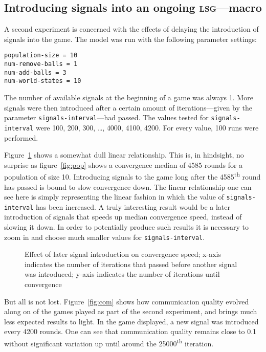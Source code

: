 \documentclass[DIV=calc,BCOR=0mm,pagesize]{scrartcl}
\newcommand{\code}[1]{\texttt{#1}}
\newcommand{\lsg}{\textsc{lsg}}
\begin{document}
\subsection{Introducing signals into an ongoing \lsg---macro}
\label{ssec:resintmacro}
A second experiment is concerned with the effects of delaying the introduction of signals into the game. The model was run with the following parameter settings:
\begin{verbatim}
population-size = 10
num-remove-balls = 1
num-add-balls = 3
num-world-states = 10
\end{verbatim}
The number of available signals at the beginning of a game was always 1.
More signals were then introduced after a certain amount of iterations---given by the parameter \code{signals-interval}---had passed.
The values tested for \code{signals-interval} were 100, 200, 300, \ldots, 4000, 4100, 4200.
For every value, 100 runs were performed.

Figure~\ref{fig:sig} shows a somewhat dull linear relationship.
This is, in hindsight, no surprise as figure~\ref{fig:pop} shows a convergence median of 4585 rounds for a population of size 10.
Introducing signals to the game long after the 4585\textsuperscript{th} round has passed is bound to slow convergence down.
The linear relationship one can see here is simply representing the linear fashion in which the value of \code{signals-interval} has been increased.
A truly interesting result would be a later introduction of signals that speeds up median convergence speed, instead of slowing it down.
In order to potentially produce such results it is necessary to zoom in and choose much smaller values for \code{signals-interval}.

\begin{figure}
	\centering
	\caption{Effect of later signal introduction on convergence speed; x-axis indicates the number of iterations that passed before another signal was introduced; y-axis indicates the number of iterations until convergence}
	\label{fig:sig}
\end{figure}

But all is not lost.
Figure~\ref{fig:com} shows how communication quality evolved along on of the games played as part of the second experiment, and brings much less expected results to light.
In the game displayed, a new signal was introduced every 4200 rounds.
One can see that communication quality remains close to 0.1 without significant variation up until around the 25000\textsuperscript{th} iteration.
\end{document}
